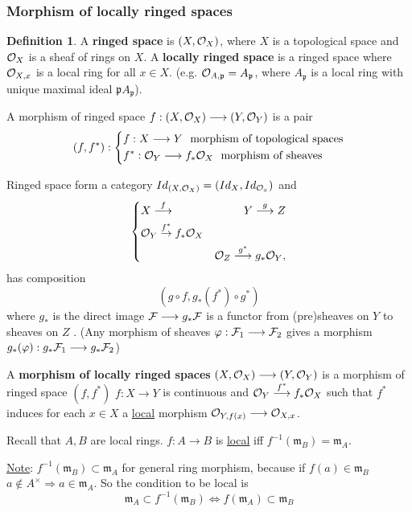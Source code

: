 \documentclass[11pt]{article}
\theoremstyle{definition}
\newtheorem{dfn}[thm]{Definition}
\newcommand{\scm}{{\mathfrak m}}
\newcommand{\scp}{{\mathfrak p}}
\newcommand{\calf}{{\cal F}}
\newcommand{\calo}{{\cal O}}
\newcommand{\rta}{\rightarrow}
\newcommand{\Lrta}{\Longrightarrow}
\newcommand{\lrta}{\longrightarrow}
\newcommand{\Llrta}{\Longleftrightarrow}
\begin{document}
\subsubsection{Morphism of locally ringed spaces}
\begin{dfn}
A \textbf{ringed space} is $(X,\calo_X)$, where $X$ is a topological space and $\calo_X$ is a sheaf of rings  on $X$. A \textbf{locally ringed space} is a ringed space where $\calo_{X,x}$ is a local ring for all $x\in X$. (e.g. $\calo_{A,\scp}=A_\scp$, where $A_\scp$ is a local ring with unique maximal ideal $\scp A_\scp$).

A morphism of ringed space $f:(X,\calo_X)\lrta (Y,\calo_Y)$ is a pair
$$
(f,f^*):\left\{\begin{aligned}
&f:X\lrta Y \ \text{  morphism of topological spaces}\\ 
& f^*:\calo_Y\lrta f_*\calo_X\ \text{ morphism of sheaves}
\end{aligned}
\right.
$$ 
\end{dfn}
Ringed space form a category $Id_{(X,\calo_X)}=(Id_X,Id_{\calo_x})$ and 
$$
\left\{\begin{aligned}
& X\overset{f}{\lrta }&Y\overset{g}{\lrta} Z\\
& \calo_Y\overset{f^*}{\rta}f_*\calo_X&\\
&& \calo_Z\overset{g^*}{\lrta}g_*\calo_Y,
\end{aligned}\right.
$$
has composition
$$
(g\circ f,g_*(f^*)\circ g^*)
$$
where $g_*$ is the direct image $\calf\lrta g_*\calf$ is a functor from (pre)sheaves on $Y$ to sheaves on $Z$
.
(Any morphism of sheaves $\varphi:\calf_1\lrta \calf_2$ gives a morphism $g_*(\varphi):g_*\calf_1\lrta g_*\calf_2$)

A \textbf{morphism of locally ringed spaces} $(X,\calo_X)\lrta (Y,\calo_Y)$
 is a morphism of ringed space $(f,f^*)$ $f:X\lrta Y$ is continuous and $\calo_Y\overset{f^*}{\lrta}f_*\calo_X$ such that $f^*$ induces for each $x\in X$ a \underline{local} morphism 
$\calo_{Y,f(x)}\lrta\calo_{X,x}$.

Recall that $A,B$ are local rings. $f: A\lrta B$ is \underline{local} iff $f^{-1}(\scm_B)=\scm_A$. 

\underline{Note}: $f^{-1}(\scm_B)\subset \scm_A$ for general ring morphism, because if $f(a)\in \scm_B$ $a\notin A^\times\Lrta a\in \scm_A$. So the condition to be local is 
$$
\scm_A\subset f^{-1}(\scm_B)\Llrta f(\scm_A)\subset \scm_B
$$
\end{document}
